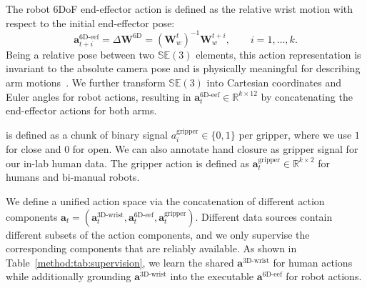 % 
The robot 6DoF end-effector action is defined as the relative wrist motion with respect to the initial end-effector pose: 
%
\begin{equation}
\boldsymbol{a}^{\text{6D-eef}}_{t+i}
= \Delta \mathbf{W}^{\text{6D}} =  \left( \mathbf{W}^{t}_{w} \right)^{-1} \mathbf{W}^{t+i}_{w},
\qquad i = 1, \dots, k.
\end{equation}
%
Being a relative pose between two $\mathbb{SE}(3)$ elements, this action representation is invariant to the absolute camera pose and is physically meaningful for describing arm motions~\cite{zheng2026egoscale}.
% 
We further transform $\mathbb{SE}(3)$ into Cartesian coordinates and Euler angles for robot actions, resulting in $\mathbf{a}_{t}^{\text{6D-eef}}\!\in\!\mathbb{R}^{k\times 12}$ by concatenating the end-effector actions for both arms.




%
is defined as a chunk of binary signal $a^{\text{gripper}}_i \in \{0, 1\}$ per gripper, where we use $1$ for close and $0$ for open.
% 
We can also annotate hand closure as gripper signal for our in-lab human data.
% 
The gripper action is defined as $\mathbf{a}^{\text{gripper}}_t\!\in \!\mathbb{R}^{k\times 2}$ for humans and bi-manual robots.




%
We define a unified action space via the concatenation of different action components 
$\mathbf{a}_t = (\mathbf{a}^{\text{3D-wrist}}_t, \mathbf{a}^{\text{6D-eef}}_t, \mathbf{a}^{\text{gripper}}_t)$. 
% 
Different data sources contain different subsets of the action components, and we only supervise the corresponding components that are reliably available.
% 
As shown in Table~\ref{method:tab:supervision}, we learn the shared $\mathbf{a}^{\text{3D-wrist}}$ for human actions while additionally grounding $\mathbf{a}^{\text{3D-wrist}}$ into the executable $\mathbf{a}^{\text{6D-eef}}$ for robot actions.




